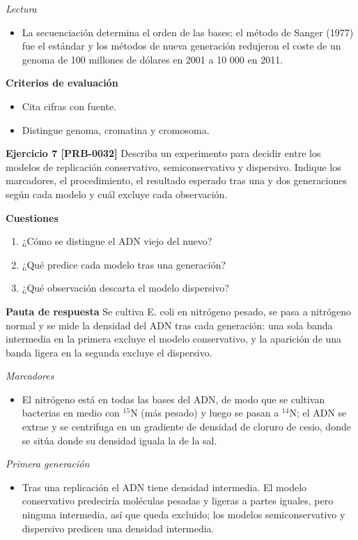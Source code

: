 \documentclass{book}
\begin{document}
\noindent\textit{Lectura}
\begin{itemize}
\item La secuenciación determina el orden de las bases: el método de Sanger (1977) fue el estándar y los métodos de nueva generación redujeron el coste de un genoma de 100 millones de dólares en 2001 a 10 000 en 2011.
\end{itemize}

\noindent\textbf{Criterios de evaluación}
\begin{itemize}
\item Cita cifras con fuente.
\item Distingue genoma, cromatina y cromosoma.
\end{itemize}

\noindent\textbf{Ejercicio 7 [PRB-0032]}
Describa un experimento para decidir entre los modelos de replicación conservativo, semiconservativo y dispersivo. Indique los marcadores, el procedimiento, el resultado esperado tras una y dos generaciones según cada modelo y cuál excluye cada observación.


\noindent\textbf{Cuestiones}
\begin{enumerate}
\item ¿Cómo se distingue el ADN viejo del nuevo?
\item ¿Qué predice cada modelo tras una generación?
\item ¿Qué observación descarta el modelo dispersivo?
\end{enumerate}

\noindent\textbf{Pauta de respuesta}
Se cultiva E. coli en nitrógeno pesado, se pasa a nitrógeno normal y se mide la densidad del ADN tras cada generación: una sola banda intermedia en la primera excluye el modelo conservativo, y la aparición de una banda ligera en la segunda excluye el dispersivo.


\noindent\textit{Marcadores}
\begin{itemize}
\item El nitrógeno está en todas las bases del ADN, de modo que se cultivan bacterias en medio con \({}^{15}\)N (más pesado) y luego se pasan a \({}^{14}\)N; el ADN se extrae y se centrifuga en un gradiente de densidad de cloruro de cesio, donde se sitúa donde su densidad iguala la de la sal.
\end{itemize}

\noindent\textit{Primera generación}
\begin{itemize}
\item Tras una replicación el ADN tiene densidad intermedia. El modelo conservativo predeciría moléculas pesadas y ligeras a partes iguales, pero ninguna intermedia, así que queda excluido; los modelos semiconservativo y dispersivo predicen una densidad intermedia.
\end{itemize}
\end{document}
